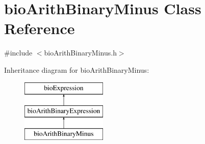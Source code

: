 \hypertarget{classbio_arith_binary_minus}{}\section{bio\+Arith\+Binary\+Minus Class Reference}
\label{classbio_arith_binary_minus}


{\ttfamily \#include $<$bio\+Arith\+Binary\+Minus.\+h$>$}

Inheritance diagram for bio\+Arith\+Binary\+Minus\+:\begin{figure}[H]
\begin{center}
\leavevmode
\includegraphics[height=3.000000cm]{classbio_arith_binary_minus}
\end{center}
\end{figure}
